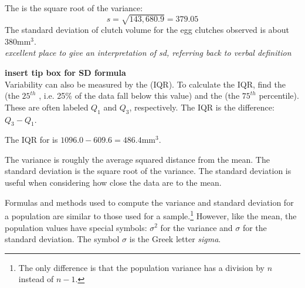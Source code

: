 \begin{doublespace}
The  is the square root of the variance:
$$s=\sqrt{143,680.9} = 379.05$$
The standard deviation of clutch volume for the egg clutches observed is about $380 \textrm{mm}^{3}$.  \\

\textit{excellent place to give an interpretation of sd, referring back to verbal definition}

\textbf{insert tip box for SD formula}\\

Variability can also be measured by the  (IQR).  To calculate the IQR, find the   (the $25^{th}$ , i.e. 25\% of the data fall below this value) and the   (the $75^{th}$ percentile). These are often labeled $Q_1$  and $Q_3$, respectively. The IQR is the difference: $Q_3 - Q_1$.

The IQR for  is $1096.0 - 609.6 = 486.4\textrm{mm}^{3}$.


\begin{termBox}{
		The variance is roughly the average squared distance from the mean. The standard deviation is the square root of the variance. The standard deviation is useful when considering how close the data are to the mean.}
\end{termBox}

Formulas and methods used to compute the variance and standard deviation for a population are similar to those used for a sample.\footnote{The only difference is that the population variance has a division by $n$ instead of $n-1$.} However, like the mean, the population values have special symbols: $\sigma_{}^2$ for the variance and $\sigma$ for the standard deviation. The symbol $\sigma$  is the Greek letter \emph{sigma}.


\end{doublespace}
